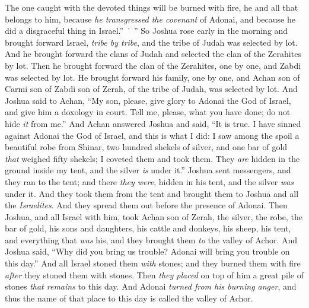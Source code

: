 \begin{biblechapter}
\verse The one caught with the devoted things will be burned with fire, he and all that belongs to him, because \textit{he transgressed the covenant} of Adonai, and because he did a disgraceful thing in Israel.” ’ ”
\verse So Joshua rose early in the morning and brought forward Israel, \textit{tribe by tribe}, and the tribe of Judah was selected by lot.
\verse And he brought forward the clans of Judah and selected the clan of the Zerahites by lot. Then he brought forward the clan of the Zerahites, one by one, and Zabdi was selected by lot.
\verse He brought forward his family, one by one, and Achan son of Carmi son of Zabdi son of Zerah, of the tribe of Judah, was selected by lot.
\verse And Joshua said to Achan, “My son, please, give glory to Adonai the God of Israel, and give him a doxology in court. Tell me, please, what you have done; do not hide \textit{it} from me.”
\verse And Achan answered Joshua and said, “It is true. I have sinned against Adonai the God of Israel, and this is what I did:
\verse I saw among the spoil a beautiful robe from Shinar, two hundred shekels of silver, and one bar of gold \textit{that} weighed fifty shekels; I coveted them and took them. They \textit{are} hidden in the ground inside my tent, and the silver \textit{is} under it.”
\verse Joshua sent messengers, and they ran to the tent; and there \textit{they were}, hidden in his tent, and the silver \textit{was} under it.
\verse And they took them from the tent and brought them to Joshua and all the \textit{Israelites}. And they spread them out before the presence of Adonai.
\verse Then Joshua, and all Israel with him, took Achan son of Zerah, the silver, the robe, the bar of gold, his sons and daughters, his cattle and donkeys, his sheep, his tent, and everything that \textit{was} his, and they brought them \textit{to} the valley of Achor.
\verse And Joshua said, “Why did you bring us trouble? Adonai will bring you trouble on this day.” And all Israel stoned them \textit{with} stones; and they burned them with fire \textit{after} they stoned them with stones.
\verse Then \textit{they placed} on top of him a great pile of stones \textit{that remains} to this day. And Adonai \textit{turned from his burning anger}, and thus the name of that place to this day is called the valley of Achor.
\end{biblechapter}

